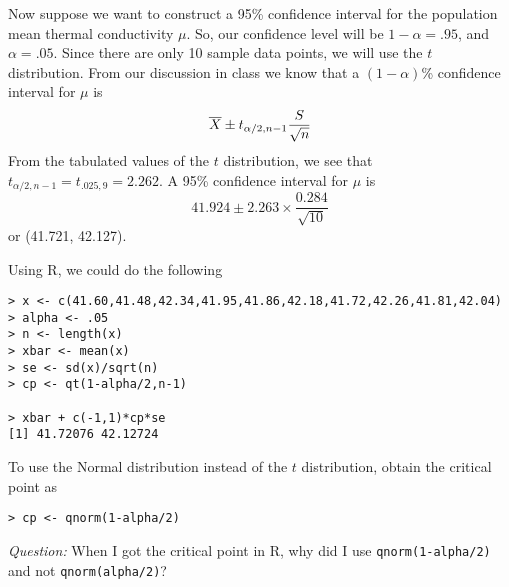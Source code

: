 Now suppose we want to construct a 95\% confidence interval for the
population mean thermal conductivity $\mu$. So, our confidence level
will be $1-\alpha=.95$, and $\alpha=.05$. Since there are only 10
sample data points, we will use the $t$ distribution. From our
discussion in class we know that a $(1-\alpha)$\% confidence interval
for $\mu$ is
\[ \overline{X} \pm t_{\alpha/2,n-1}\frac{S}{\sqrt{n}} \]
From the tabulated values of the $t$ distribution, we see that
$t_{\alpha/2,n-1} = t_{.025,9} = 2.262$. A 95\% confidence interval for $\mu$ is
\[  41.924 \pm 2.263 \times \frac{0.284}{\sqrt{10}} \]
or (41.721, 42.127).

Using R, we could do the following

\vspace{.1in}
\begin{Verbatim}[samepage=true]
> x <- c(41.60,41.48,42.34,41.95,41.86,42.18,41.72,42.26,41.81,42.04)
> alpha <- .05
> n <- length(x)
> xbar <- mean(x)
> se <- sd(x)/sqrt(n)
> cp <- qt(1-alpha/2,n-1)

> xbar + c(-1,1)*cp*se
[1] 41.72076 42.12724
\end{Verbatim}
\vspace{.1in}
To use the Normal distribution instead of the $t$ distribution, obtain the
critical point as
\begin{Verbatim}
> cp <- qnorm(1-alpha/2)
\end{Verbatim}

\emph{Question:} When I got the critical point in R, why did I use
\texttt{qnorm(1-alpha/2)} and not \texttt{qnorm(alpha/2)}?


